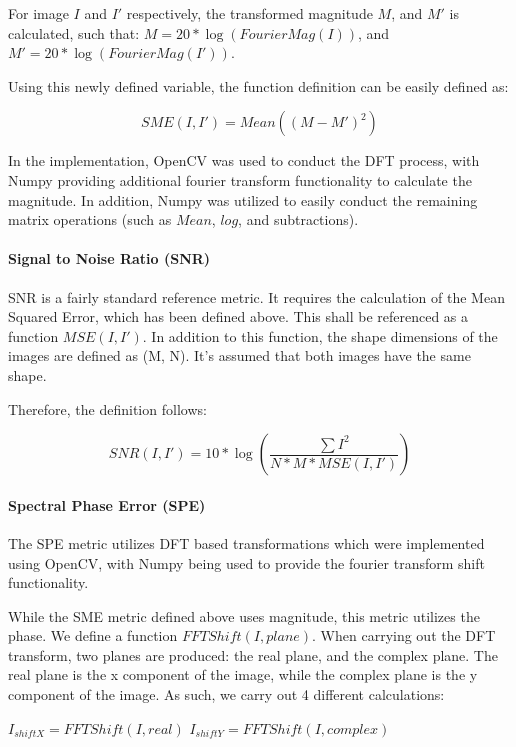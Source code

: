 \documentclass[10pt,a4paper]{article}
\begin{document}
                For image $I$ and $I'$ respectively, the transformed magnitude $M$, and $M'$ is calculated, such that:
                $M = 20*\log(FourierMag(I))$, and $M' = 20 * \log(FourierMag(I'))$.

                Using this newly defined variable, the function definition can be easily defined as:

                $$SME(I, I') = Mean((M - M')^2)$$

                In the implementation, OpenCV was used to conduct the DFT process, with Numpy providing additional fourier transform functionality to calculate the magnitude. In addition, Numpy
                was utilized to easily conduct the remaining matrix operations (such as $Mean$, $log$, and subtractions).

            \paragraph{Signal to Noise Ratio (SNR)}
                SNR is a fairly standard reference metric. It requires the calculation of the Mean Squared Error, which has been defined above. This shall be referenced as a function $MSE(I, I')$.
                In addition to this function, the shape dimensions of the images are defined as (M, N). It's assumed that both images have the same shape.

                Therefore, the definition follows:

                $$SNR(I, I') = 10 * \log(\frac{\sum I^2}{N * M * MSE(I, I')})$$

            \paragraph{Spectral Phase Error (SPE)}
                The SPE metric utilizes DFT based transformations which were implemented using OpenCV, with Numpy being used to provide the fourier transform shift functionality.

                While the SME metric defined above uses magnitude, this metric utilizes the phase. We define a function $FFTShift(I, plane)$. When carrying out the DFT transform,
                two planes are produced: the real plane, and the complex plane. The real plane is the x component of the image, while the complex plane is the y component of the image.
                As such, we carry out 4 different calculations:

                $I_{shiftX} = FFTShift(I, real)$
                $I_{shiftY} = FFTShift(I, complex)$
\end{document}

